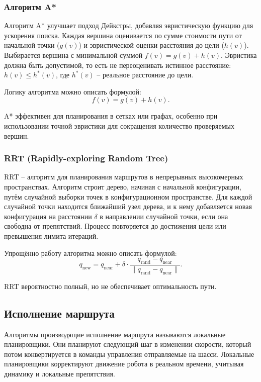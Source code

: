 {\subsubsection{Алгоритм A*}
Алгоритм A* улучшает подход Дейкстры,
добавляя эвристическую функцию для ускорения поиска.
Каждая вершина оценивается по сумме стоимости пути от начальной точки ($g(v)$)
и эвристической оценки расстояния до цели ($h(v)$).
Выбирается вершина с минимальной суммой $f(v) = g(v) + h(v)$.
Эвристика должна быть допустимой, то есть не переоценивать истинное расстояние: $h(v) \leq h^*(v)$,
где $h^*(v)$ -- реальное расстояние до цели.

Логику алгоритма можно описать формулой:
\begin{equation}
f(v) = g(v) + h(v).
\end{equation}

A* эффективен для планирования в сетках или графах,
особенно при использовании точной эвристики для сокращения количество проверяемых вершин.

\subsubsection{RRT (Rapidly-exploring Random Tree)}
RRT -- алгоритм для планирования маршрутов в непрерывных высокомерных
пространствах. Алгоритм строит дерево, начиная с начальной конфигурации, путём
случайной выборки точек в конфигурационном пространстве. Для каждой случайной
точки находится ближайший узел дерева, и к нему добавляется новая конфигурация
на расстоянии $\delta$ в направлении случайной точки, если она свободна от
препятствий. Процесс повторяется до достижения цели или превышения лимита
итераций.

Упрощённо работу алгоритма можно описать формулой:
\begin{equation}
q_{\text{new}} = q_{\text{near}} + \delta \cdot \frac{q_{\text{rand}} - q_{\text{near}}}{\| q_{\text{rand}} - q_{\text{near}} \|}.
\end{equation}

RRT вероятностно полный, но не обеспечивает оптимальность пути.

\subsection{Исполнение маршрута}
Алгоритмы производящие исполнение маршрута называются локальные планировщики.
Они планируют следующий шаг в изменении скорости, который потом конвертируется в
команды управления отправляемые на шасси.
Локальные планировщики корректируют движение робота в реальном времени, учитывая
динамику и локальные препятствия.

}
